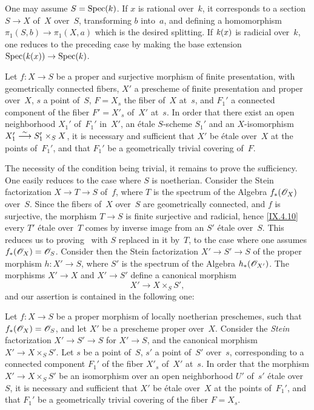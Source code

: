 One may assume $S=\operatorname{Spec}(k)$. If $x$ is rational over~$k$, it
corresponds to a section $S\to X$ of~$X$ over~$S$, transforming $b$
into~$a$, and defining a homomorphism $\pi_1(S,b)\to \pi_1(X,a)$ which
is the desired splitting. If $\mathit{k}(x)$ is radicial over~$k$, one
reduces to the preceding case by making the base extension
$\Spec(\kres(x))\to\Spec(k)$.

\begin{theorem}
\label{IX.6.5}
Let $f\colon X\to S$ be a proper and surjective morphism of finite
presentation, with geometrically connected fibers, $X'$ a prescheme of
finite presentation and proper over~$X$, $s$ a point of~$S$, $F=X_s$
the fiber of~$X$ at~$s$, and $F_1'$ a connected component of the fiber
$F'=X'_s$ of~$X'$ at~$s$. In order that there exist an open
neighborhood $X_1'$ of~$F_1'$ in~$X'$, an étale $S$-scheme $S_1'$ and
an $X$-isomorphism $X_1'\overset{\sim}{\longrightarrow} S_1'\times_S X$, it is necessary and
sufficient that $X'$ be étale over~$X$ at the points of~$F_1'$, and
that $F_1'$ be a geometrically trivial covering of~$F$.
\end{theorem}

The
necessity of the condition being trivial, it remains to prove the
sufficiency. One easily reduces to the case where $S$ is
noetherian. Consider the Stein factorization $X\to T\to S$ of~$f$,
where $T$ is the spectrum of the Algebra $f_*(\cal{O}_X)$ over~$S$.
Since the fibers of~$X$ over~$S$ are geometrically connected, and $f$
is surjective, the morphism $T\to S$ is finite surjective and radicial,
hence \eqref{IX.4.10} every $T'$ étale over~$T$ comes by inverse image
from an $S'$ étale over~$S$. This reduces us to
proving~
with $S$ replaced in it by~$T$, \ie to the case where one assumes
$f_*(\cal{O}_X)=\cal{O}_S$. Consider then the Stein factorization
$X'\to S'\to S$ of the proper morphism $h\colon X'\to S$, where $S'$
is the spectrum of the Algebra $h_*(\cal{O}_{X'})$. The morphisms
$X'\to X$ and $X'\to S'$ define a canonical morphism
$$
X'\to X\times_S S',
$$
and our assertion is contained in the following one:

\begin{corollary}
\label{IX.6.6}
Let $f\colon X\to S$ be a proper morphism of locally noetherian
preschemes, such that $f_*(\cal{O}_X)=\cal{O}_S$, and let $X'$ be a
prescheme proper over~$X$. Consider the \emph{Stein} factorization
$X'\to S'\to S$ for $X'\to S$, and the canonical morphism $X'\to
X\times_S S'$. Let $s$ be a point of~$S$, $s'$ a point of~$S'$
over~$s$, corresponding to a connected component $F_1'$ of the fiber
$X'_s$ of~$X'$ at~$s$. In order that the morphism $X'\to X\times_S S'$
be an isomorphism over an open neighborhood $U'$ of~$s'$ étale
over~$S$, it is necessary and sufficient that $X'$ be étale over~$X$ at
the points of~$F_1'$, and that $F_1'$ be a geometrically trivial
covering of the fiber $F=X_s$.
\end{corollary}

